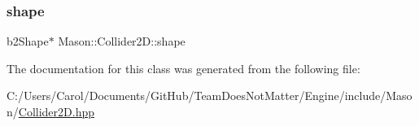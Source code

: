 \hypertarget{class_mason_1_1_collider2_d_a82de033fe10f7da3fd079c7ff54eaf94}{}\label{class_mason_1_1_collider2_d_a82de033fe10f7da3fd079c7ff54eaf94} 
\subsubsection{\texorpdfstring{shape}{shape}}
{\footnotesize\ttfamily b2\+Shape$\ast$ Mason\+::\+Collider2\+D\+::shape}



The documentation for this class was generated from the following file\+:\begin{DoxyCompactItemize}
\item 
C\+:/\+Users/\+Carol/\+Documents/\+Git\+Hub/\+Team\+Does\+Not\+Matter/\+Engine/include/\+Mason/\hyperlink{_collider2_d_8hpp}{Collider2\+D.\+hpp}\end{DoxyCompactItemize}
